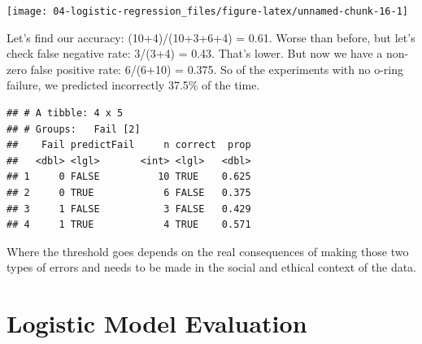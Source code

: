 \documentclass[
]{book}
\newenvironment{Shaded}{\begin{snugshade}}{\end{snugshade}}
\newcommand{\CommentTok}[1]{\textcolor[rgb]{0.56,0.35,0.01}{\textit{#1}}}
\newcommand{\DataTypeTok}[1]{\textcolor[rgb]{0.13,0.29,0.53}{#1}}
\newcommand{\FloatTok}[1]{\textcolor[rgb]{0.00,0.00,0.81}{#1}}
\newcommand{\KeywordTok}[1]{\textcolor[rgb]{0.13,0.29,0.53}{\textbf{#1}}}
\newcommand{\NormalTok}[1]{#1}
\newcommand{\OperatorTok}[1]{\textcolor[rgb]{0.81,0.36,0.00}{\textbf{#1}}}
\newcommand{\StringTok}[1]{\textcolor[rgb]{0.31,0.60,0.02}{#1}}
\begin{document}
\begin{center}\texttt{[image: 04-logistic-regression\_files/figure-latex/unnamed-chunk-16-1]} \end{center}

Let's find our accuracy: (10+4)/(10+3+6+4) = 0.61. Worse than before, but let's check false negative rate: 3/(3+4) = 0.43. That's lower. But now we have a non-zero false positive rate: 6/(6+10) = 0.375. So of the experiments with no o-ring failure, we predicted incorrectly 37.5\% of the time.

\begin{Shaded}
\end{Shaded}

\begin{verbatim}
## # A tibble: 4 x 5
## # Groups:   Fail [2]
##    Fail predictFail     n correct  prop
##   <dbl> <lgl>       <int> <lgl>   <dbl>
## 1     0 FALSE          10 TRUE    0.625
## 2     0 TRUE            6 FALSE   0.375
## 3     1 FALSE           3 FALSE   0.429
## 4     1 TRUE            4 TRUE    0.571
\end{verbatim}

Where the threshold goes depends on the real consequences of making those two types of errors and needs to be made in the social and ethical context of the data.

\hypertarget{logistic-model-evaluation}{%
\section{Logistic Model Evaluation}\label{logistic-model-evaluation}}
\end{document}

